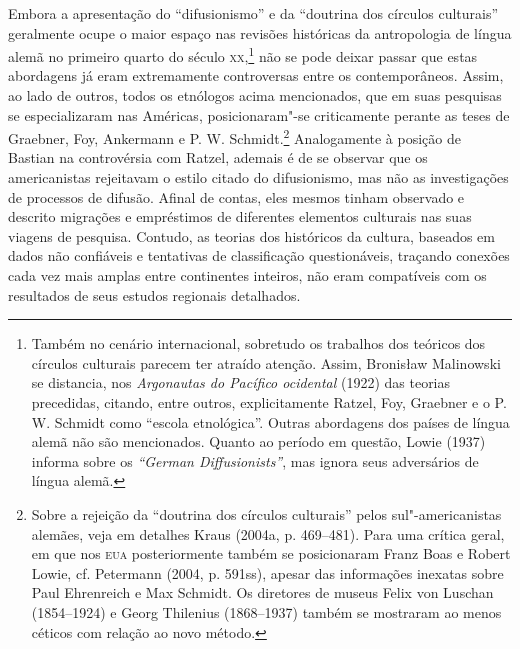 Embora a apresentação do ``difusionismo'' e da ``doutrina dos círculos
culturais'' geralmente ocupe o maior espaço nas revisões históricas da
antropologia de língua alemã no primeiro quarto do século \textsc{xx},\footnote{Também
  no cenário internacional, sobretudo os trabalhos dos teóricos dos
  círculos culturais parecem ter atraído atenção. Assim, Bronisław
  Malinowski se distancia, nos \emph{Argonautas do Pacífico ocidental}
  (1922) das teorias precedidas, citando, entre outros, explicitamente
  Ratzel, Foy, Graebner e o P. W. Schmidt como ``escola etnológica''.
  Outras abordagens dos países de língua alemã não são mencionados.
  Quanto ao período em questão, Lowie (1937) informa sobre os
  \emph{``German Diffusionists''}, mas ignora seus adversários de língua
  alemã.} não se pode deixar passar que estas abordagens já eram
extremamente controversas entre os contemporâneos. Assim, ao lado de
outros, todos os etnólogos acima mencionados, que em suas pesquisas se
especializaram nas Américas, posicionaram"-se criticamente perante as
teses de Graebner, Foy, Ankermann e P. W. Schmidt.\footnote{Sobre a
  rejeição da ``doutrina dos círculos culturais'' pelos
  sul"-americanistas alemães, veja em detalhes Kraus (2004a, p.
  469--481). Para uma crítica geral, em que nos \textsc{eua} posteriormente também
  se posicionaram Franz Boas e Robert Lowie, cf. Petermann (2004, p.
  591ss), apesar das informações inexatas sobre Paul Ehrenreich e Max
  Schmidt. Os diretores de museus Felix von Luschan (1854--1924) e Georg
  Thilenius (1868--1937) também se mostraram ao menos céticos com relação
  ao novo método.} Analogamente à posição de Bastian na controvérsia com
Ratzel, ademais é de se observar que os americanistas rejeitavam o
estilo citado do difusionismo, mas não as investigações de processos de
difusão. Afinal de contas, eles mesmos tinham observado e descrito
migrações e empréstimos de diferentes elementos culturais nas suas
viagens de pesquisa. Contudo, as teorias dos históricos da cultura,
baseados em dados não confiáveis e tentativas de classificação
questionáveis, traçando conexões cada vez mais amplas entre continentes
inteiros, não eram compatíveis com os resultados de seus estudos
regionais detalhados.

